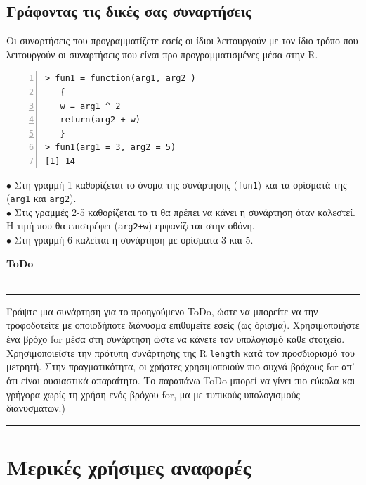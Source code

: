\documentclass[a4paper,10pt,twocolumn]{article}
\makeatletter
\newenvironment{ToDo} {
  \begin{flushright}
    \hfill
    \begin{minipage}{0.9\columnwidth}
    \textsf{\textbf{ToDo}} \\
      \vspace{-0.7cm}\\
      {\color{Gray}\rule[-0.05cm]{\columnwidth}{1.5pt}}} {
      {\color{Gray}\rule[0.3cm]{\columnwidth}{1.5pt}}
    \end{minipage}
    \vspace{0.3cm}
  \end{flushright}
  }
\let\SF@@footnote\footnote
\def\footnote{\ifx\protect\@typeset@protect
 \expandafter\SF@@footnote
 \else
 \expandafter\SF@gobble@opt
 \fi
}
\edef\SF@gobble@opt{\noexpand\protect
 \expandafter\noexpand\csname SF@gobble@opt \endcsname}
\makeatother
\begin{document}
\subsection{Γράφοντας τις δικές σας συναρτήσεις}
\label{sec:progfunc}

Οι συναρτήσεις που προγραμματίζετε εσείς οι ίδιοι λειτουργούν με τον ίδιο τρόπο που λειτουργούν οι συναρτήσεις
που είναι προ-προγραμματισμένες μέσα στην R.

\begin{Verbatim}[frame=single,numbers=left,gobble=0, xleftmargin=0.35cm, numbersep=0.1cm]
> fun1 = function(arg1, arg2 )
   {
   w = arg1 ^ 2
   return(arg2 + w)
   }
> fun1(arg1 = 3, arg2 = 5) 
[1] 14

\end{Verbatim}

\noindent $\bullet$ Στη γραμμή 1 καθορίζεται το όνομα της συνάρτησης (\texttt{fun1}) και τα ορίσματά της
(\texttt{arg1} και \texttt{arg2}). \\
\noindent $\bullet$ Στις γραμμές 2-5 καθορίζεται το τι θα πρέπει να κάνει η συνάρτηση όταν καλεστεί. Η τιμή
που θα επιστρέφει (\texttt{arg2+w}) εμφανίζεται στην οθόνη. \\
\noindent $\bullet$ Στη γραμμή 6 καλείται η συνάρτηση με ορίσματα 3 και 5.

\begin{ToDo}
Γράψτε μια συνάρτηση για το προηγούμενο ToDo, ώστε να μπορείτε να την τροφοδοτείτε με οποιοδήποτε διάνυσμα 
επιθυμείτε εσείς (ως όρισμα). Χρησιμοποιήστε ένα βρόχο for μέσα στη συνάρτηση ώστε να κάνετε τον υπολογισμό
κάθε στοιχείο. Χρησιμοποιείστε την πρότυπη συνάρτησης της R \texttt{length} κατά τον προσδιορισμό του μετρητή.
\footnote{Στην πραγματικότητα, οι χρήστες χρησιμοποιούν πιο συχνά βρόχους for απ' ότι είναι ουσιαστικά
απαραίτητο. Το παραπάνω ToDo μπορεί να γίνει πιο εύκολα και γρήγορα χωρίς τη χρήση ενός βρόχου for, μα με 
τυπικούς υπολογισμούς διανυσμάτων.})
\end{ToDo}

\section{Μερικές χρήσιμες αναφορές}
\end{document}

